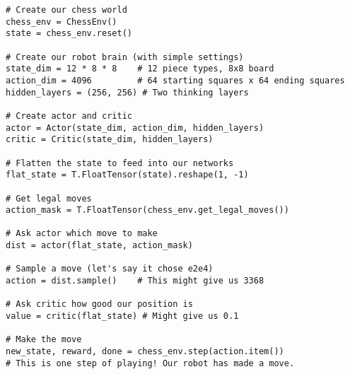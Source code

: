 \documentclass[11pt]{article}
\begin{document}
\begin{tcolorbox}[colback=orange!5!white,colframe=orange!75!black,title=Example: How Our Robot Makes Decisions, width=\textwidth]
\begin{lstlisting}[style=Python, basicstyle=\ttfamily\small]
# Create our chess world
chess_env = ChessEnv()
state = chess_env.reset()

# Create our robot brain (with simple settings)
state_dim = 12 * 8 * 8    # 12 piece types, 8x8 board
action_dim = 4096         # 64 starting squares x 64 ending squares
hidden_layers = (256, 256) # Two thinking layers

# Create actor and critic
actor = Actor(state_dim, action_dim, hidden_layers)
critic = Critic(state_dim, hidden_layers)

# Flatten the state to feed into our networks
flat_state = T.FloatTensor(state).reshape(1, -1)

# Get legal moves
action_mask = T.FloatTensor(chess_env.get_legal_moves())

# Ask actor which move to make
dist = actor(flat_state, action_mask)

# Sample a move (let's say it chose e2e4)
action = dist.sample()    # This might give us 3368

# Ask critic how good our position is
value = critic(flat_state) # Might give us 0.1

# Make the move
new_state, reward, done = chess_env.step(action.item())
# This is one step of playing! Our robot has made a move.
\end{lstlisting}
\end{tcolorbox}
\end{document}

